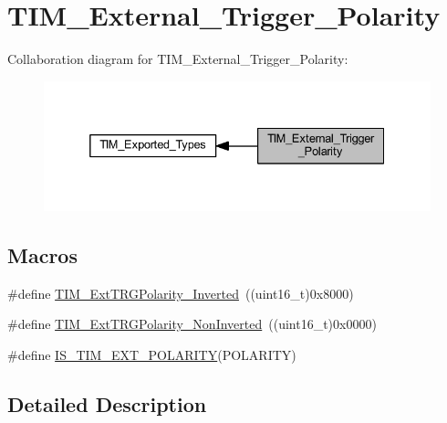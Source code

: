\hypertarget{group___t_i_m___external___trigger___polarity}{}\section{T\+I\+M\+\_\+\+External\+\_\+\+Trigger\+\_\+\+Polarity}
\label{group___t_i_m___external___trigger___polarity}
Collaboration diagram for T\+I\+M\+\_\+\+External\+\_\+\+Trigger\+\_\+\+Polarity\+:
\nopagebreak
\begin{figure}[H]
\begin{center}
\leavevmode
\includegraphics[width=332pt]{group___t_i_m___external___trigger___polarity}
\end{center}
\end{figure}
\subsection*{Macros}
\begin{DoxyCompactItemize}
\item 
\#define \hyperlink{group___t_i_m___external___trigger___polarity_ga96f3959a02c0491ab8d65cfa384ce7e3}{T\+I\+M\+\_\+\+Ext\+T\+R\+G\+Polarity\+\_\+\+Inverted}~((uint16\+\_\+t)0x8000)
\item 
\#define \hyperlink{group___t_i_m___external___trigger___polarity_ga63fe7c58c491d2a812d5621b71c2d0c5}{T\+I\+M\+\_\+\+Ext\+T\+R\+G\+Polarity\+\_\+\+Non\+Inverted}~((uint16\+\_\+t)0x0000)
\item 
\#define \hyperlink{group___t_i_m___external___trigger___polarity_ga489ea1fed28375dec49cf1b8dfac47ca}{I\+S\+\_\+\+T\+I\+M\+\_\+\+E\+X\+T\+\_\+\+P\+O\+L\+A\+R\+I\+TY}(P\+O\+L\+A\+R\+I\+TY)
\end{DoxyCompactItemize}


\subsection{Detailed Description}


